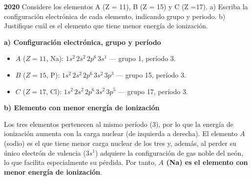 \begin{exerciseEVAU}
    \textbf{2020} Considere los elementos A (Z = 11), B (Z = 15) y C (Z =17). a)  Escriba la configuración electrónica de cada elemento, indicando grupo y periodo. b)  Justifique cuál es el elemento que tiene menor energía de ionización.
    \begin{solu}

        \textbf{a) Configuración electrónica, grupo y período}

        \begin{itemize}
            \item \(A\) (\(Z=11\), Na): \(1s^2\,2s^2\,2p^6\,3s^1\) — grupo 1, período 3.
            \item \(B\) (\(Z=15\), P): \(1s^2\,2s^2\,2p^6\,3s^2\,3p^3\) — grupo 15, período 3.
            \item \(C\) (\(Z=17\), Cl): \(1s^2\,2s^2\,2p^6\,3s^2\,3p^5\) — grupo 17, período 3.
        \end{itemize}

        \textbf{b) Elemento con menor energía de ionización}

        Los tres elementos pertenecen al mismo período (3), por lo que la energía de ionización aumenta con la carga nuclear (de izquierda a derecha). El elemento \(A\) (sodio) es el que tiene menor carga nuclear de los tres y, además, al perder su único electrón de valencia (\(3s^1\)) adquiere la configuración de gas noble del neón, lo que facilita especialmente su pérdida. Por tanto, \textbf{\(A\) (Na) es el elemento con menor energía de ionización}.

    \end{solu}
\end{exerciseEVAU}


